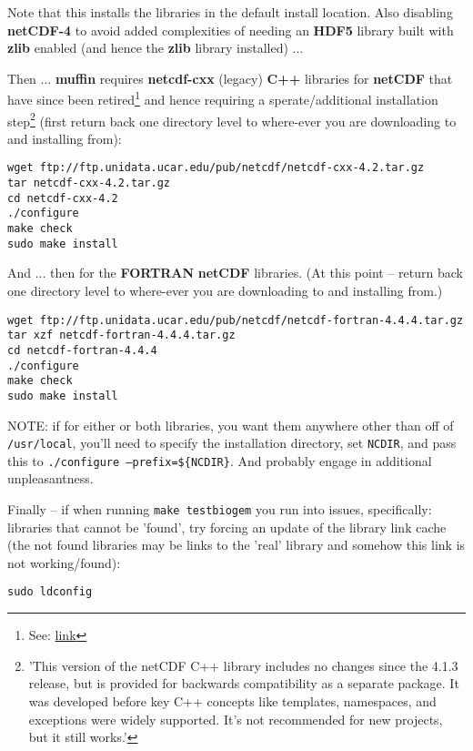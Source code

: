 \documentclass[11pt,fleqn]{book} %
\begin{document}
\begin{enumerate}[noitemsep]
Note that this installs the libraries in the default install location. Also disabling \textbf{netCDF-4} to avoid added complexities of needing an \textbf{HDF5} library built with \textbf{zlib} enabled (and hence the \textbf{zlib} library installed) ...

Then ... \textbf{muffin} requires \textbf{netcdf-cxx} (legacy) \textbf{C++} libraries for \textbf{netCDF} that have since been retired\footnote{See: \href{https://www.unidata.ucar.edu/support/help/MailArchives/netcdf/msg12236.html}{link}} and hence requiring a sperate/additional installation step\footnote{'This version of the netCDF C++ library includes no changes since the 4.1.3 release, but is provided for backwards compatibility as a separate package. It was developed before key C++ concepts like templates, namespaces, and exceptions were widely supported. It's not recommended for new projects, but it still works.'} (first return back one directory level to where-ever you are downloading to and installing from):

\begin{verbatim}
wget ftp://ftp.unidata.ucar.edu/pub/netcdf/netcdf-cxx-4.2.tar.gz
tar netcdf-cxx-4.2.tar.gz
cd netcdf-cxx-4.2
./configure
make check 
sudo make install
\end{verbatim}

And ... then for the \textbf{FORTRAN} \textbf{netCDF} libraries. (At this point -- return back one directory level to where-ever you are downloading to and installing from.)

\begin{verbatim}
wget ftp://ftp.unidata.ucar.edu/pub/netcdf/netcdf-fortran-4.4.4.tar.gz
tar xzf netcdf-fortran-4.4.4.tar.gz
cd netcdf-fortran-4.4.4
./configure
make check
sudo make install
\end{verbatim}

NOTE: if for either or both libraries, you want them anywhere other than off of \texttt{/usr/local}, you'll need to specify the installation directory, set \texttt{NCDIR}, and pass this to \texttt{./configure --prefix=\$\{NCDIR\}}. And probably engage in additional unpleasantness.

Finally -- if when running \texttt{make testbiogem} you run into issues, specifically: libraries that cannot be 'found', try forcing an update of the library link cache (the not found libraries may be links to the 'real' library and somehow this link is not working/found): 

\begin{verbatim}
sudo ldconfig
\end{verbatim}


\end{enumerate}
\end{document}
